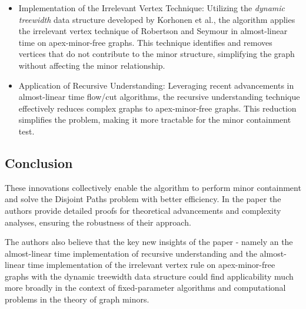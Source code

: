 \begin{itemize}
    \item 
    Implementation of the Irrelevant Vertex Technique: Utilizing the \textit{dynamic treewidth} data structure developed by Korhonen et al., the algorithm applies the irrelevant vertex technique of Robertson and Seymour in almost-linear time on apex-minor-free graphs. This technique identifies and removes vertices that do not contribute to the minor structure, simplifying the graph without affecting the minor relationship.
\item Application of Recursive Understanding: Leveraging recent advancements in almost-linear time flow/cut algorithms, the recursive understanding technique effectively reduces complex graphs to apex-minor-free graphs. This reduction simplifies the problem, making it more tractable for the minor containment test.
\end{itemize}

\subsection{Conclusion}
These innovations collectively enable the algorithm to perform minor containment and solve the Disjoint Paths problem with better efficiency. In the paper the authors provide detailed proofs for theoretical advancements and complexity analyses, ensuring the robustness of their approach.

The authors also believe that the key new insights of the paper - namely an the almost-linear time implementation of recursive understanding and the almost-linear time implementation of the irrelevant vertex rule on apex-minor-free graphs with the dynamic treewidth data structure  could find applicability much more broadly in the context of fixed-parameter algorithms and computational problems in the theory of graph minors.



